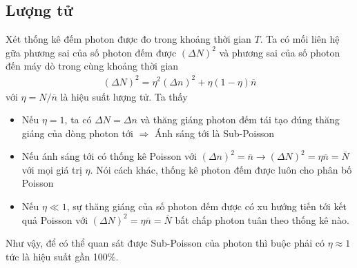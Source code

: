 \documentclass{report}
\begin{document}
\subsection{Lượng tử}
Xét thống kê đếm photon được đo trong khoảng thời gian $T$. Ta có mối liên hệ gữa phương sai của số photon đếm được $(\Delta N)^{2}$ và phương sai của số photon đến máy dò trong cùng khoảng thời gian
\begin{gather}
	(\Delta N)^{2} = \eta^{2} (\Delta n)^{2} + \eta(1-\eta) \overline{n}
\end{gather}
với $\eta = N / \overline{n}$ là hiệu suất lượng tử.
Ta thấy
\begin{itemize}
	\item Nếu $\eta = 1$, ta có $\Delta N = \Delta n$ và thăng giáng photon đếm tái tạo đúng thăng giáng của dòng photon tới $\Rightarrow$ Ánh sáng tới là Sub-Poisson 
	\item  Nếu ánh sáng tới có thống kê Poisson với $(\Delta n)^{2} = \overline{n} \rightarrow (\Delta N)^{2} = \eta \overline{n} = \overline{N}$ với mọi giá trị $\eta$. Nói cách khác, thống kê photon đếm được luôn cho phân bố Poisson\\
	\item  Nếu $\eta \ll 1$, sự thăng giáng của số photon đếm được có xu hướng tiến tới kết quả Poisson với $(\Delta N)^{2} = \eta \overline{n} = \overline{N}$ bất chấp photon tuân theo thống kê nào. 
\end{itemize}
Như vậy, để có thể quan sát được Sub-Poisson của photon thì buộc phải có $\eta \approx 1$ tức là hiệu suất gần 100\%.
\end{document}
